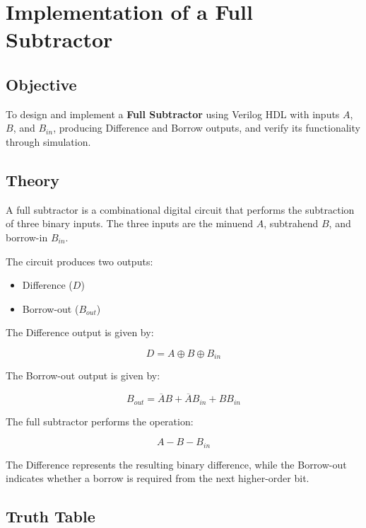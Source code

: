 \documentclass[12pt,a4paper]{report}
\begin{document}
\vspace{2.5cm}


\chapter{Implementation of a Full Subtractor}
\label{ch:pdf11}

\section{Objective}

To design and implement a \textbf{Full Subtractor} using Verilog HDL with inputs $A$, $B$, and $B_{in}$, producing Difference and Borrow outputs, and verify its functionality through simulation.

\section{Theory}

A full subtractor is a combinational digital circuit that performs the subtraction of three binary inputs. The three inputs are the minuend $A$, subtrahend $B$, and borrow-in $B_{in}$.

The circuit produces two outputs:

\begin{itemize}
    \item Difference ($D$)
    \item Borrow-out ($B_{out}$)
\end{itemize}

The Difference output is given by:

\[
D = A \oplus B \oplus B_{in}
\]

The Borrow-out output is given by:

\[
B_{out} = \overline{A}B + \overline{A}B_{in} + BB_{in}
\]

The full subtractor performs the operation:

\[
A - B - B_{in}
\]

The Difference represents the resulting binary difference, while the Borrow-out indicates whether a borrow is required from the next higher-order bit.

\section{Truth Table}
\end{document}
